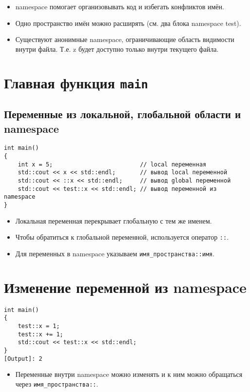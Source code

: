 \documentclass[10pt,a4paper]{article}
\begin{document}
\begin{itemize}
  \item namespace помогает организовывать код и избегать конфликтов имён.
  \item Одно пространство имён можно расширять (см. два блока namespace test).
  \item Существуют анонимные namespace, ограничивающие область видимости внутри файла. Т.е. z будет доступно только внутри текущего файла.
\end{itemize}

\section{Главная функция \texttt{main}}

\subsection{Переменные из локальной, глобальной области и namespace}
\begin{lstlisting}
int main()
{
    int x = 5;                         // local переменная
    std::cout << x << std::endl;       // вывод local переменной
    std::cout << ::x << std::endl;     // вывод global переменной
    std::cout << test::x << std::endl; // вывод переменной из namespace
}
\end{lstlisting}

\begin{itemize}
  \item Локальная переменная перекрывает глобальную с тем же именем.
  \item Чтобы обратиться к глобальной переменной, используется оператор \texttt{::}.
  \item Для переменных в namespace указываем \texttt{имя\_пространства::имя}.
\end{itemize}

\section{Изменение переменной из namespace}
\begin{lstlisting}
int main()
{
    test::x = 1; 
    test::x += 1;             
    std::cout << test::x << std::endl;
}
[Output]: 2
\end{lstlisting}

\begin{itemize}
  \item Переменные внутри namespace можно изменять и к ним можно обращаться через \texttt{имя\_пространства::}.
\end{itemize}
\end{document}
